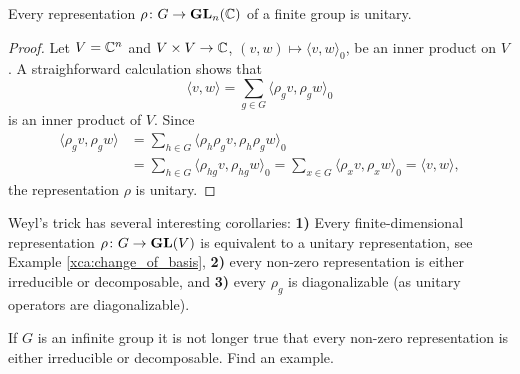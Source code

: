 \begin{proposition}
    Every representation $\rho\colon G\to\mathbf{GL}_n(\mathbb{C})$ 
    of a finite group is unitary.
\end{proposition}

\begin{proof}
	Let $V=\mathbb{C}^n$ and 
	$V\times V\to\mathbb{C}$, $(v,w)\mapsto\langle v,w\rangle_0$, be an inner
    product on $V$. A straighforward calculation shows that
    \[
    \langle v,w\rangle=\sum_{g\in G}\langle\rho_gv,\rho_gw\rangle_0
    \]
    is an inner product of $V$. Since
    \begin{align*}
    \langle\rho_gv,\rho_gw\rangle&=\sum_{h\in G}\langle\rho_h\rho_gv,\rho_h\rho_gw\rangle_0\\
    &=\sum_{h\in G}\langle\rho_{hg}v,\rho_{hg}w\rangle_0=\sum_{x\in G}\langle\rho_xv,\rho_xw\rangle_0=\langle v,w\rangle,
    \end{align*}
    the representation $\rho$ is unitary.
\end{proof}

\label{rho_diagonalizable}
Weyl's trick has several interesting corollaries:  
\textbf{1)} Every finite-dimensional representation $\rho\colon G\to\mathbf{GL}(V)$ is equivalent to a unitary representation, 
see Example \ref{xca:change_of_basis}, \textbf{2)} every non-zero representation is either
irreducible or decomposable, and \textbf{3)} every $\rho_g$ is diagonalizable
(as unitary operators are diagonalizable).

\begin{exercise}
    If $G$ is an infinite group it is not longer true that every non-zero representation
    is either irreducible or decomposable. Find an example.
\end{exercise}

